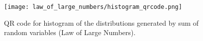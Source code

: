     \begin{figure}[H]
        \centering
        \texttt{[image: law\_of\_large\_numbers/histogram\_qrcode.png]}
        \caption{QR code for histogram of the distributions generated by sum of random variables (Law of Large Numbers).}
        \label{fig_qr:law_of_large_numbers}
    \end{figure}

